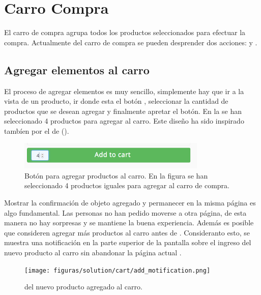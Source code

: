 \section{Carro Compra}
	El carro de compra agrupa todos los productos seleccionados para efectuar la compra. Actualmente del carro de compra se pueden desprender dos acciones:  y .

	\subsection{Agregar elementos al carro}\label{chapter:section:carro_compra:subsection:add}

		El proceso de agregar elementos es muy sencillo, simplemente hay que ir a la vista de un producto, ir donde esta el botón \addtocartLABEL, seleccionar la cantidad de productos que se desean agregar y finalmente apretar el botón. En la  se han seleccionado 4 productos para agregar al carro. Este diseño ha sido inspirado tambíen por el \websiteINT de \shopifyNAME ().

		\begin{figure}[H]
			\centering
			\includegraphics[width=0.8\textwidth]{figuras/solution/cart/button.png}
			\caption{Botón para agregar productos al carro. En la figura se han seleccionado 4 productos iguales para agregar al carro de compra.}
			\label{figure:solution:cart:button}
		\end{figure}

		Mostrar la confirmación de objeto agregado y permanecer en la misma página es algo fundamental. Las personas no han pedido moverse a otra página, de esta manera no hay sorpresas y se mantiene la buena experiencia. Además es posible que consideren agregar más productos al carro antes de \checkoutCOM \cite{online_official_conversionxl_checkout_flow}. Consideranto esto, se muestra una notificación en la parte superior de la pantalla sobre el ingreso del nuevo producto al carro sin abandonar la página actual .

		\begin{figure}[H]
			\centering
			\texttt{[image: figuras/solution/cart/add\_motification.png]}
			\caption{\FeedbackCPT del nuevo producto agregado al carro.}
			\label{figure:solution:cart:add_motification}
		\end{figure}

